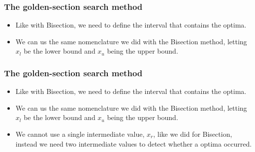 \documentclass{if-beamer}
\begin{document}
\begin{frame}[t]
	\frametitle{The golden-section search method}
	\begin{itemize}
		\item Like with Bisection, we need to define the interval that contains the optima.
		\item We can us the same nomenclature we did with the Bisection method, letting $x_l$ be the lower bound and $x_u$ being the upper bound.
	\end{itemize}
\end{frame}

\begin{frame}[t]
	\frametitle{The golden-section search method}
	\begin{itemize}
		\item Like with Bisection, we need to define the interval that contains the optima.
		\item We can us the same nomenclature we did with the Bisection method, letting $x_l$ be the lower bound and $x_u$ being the upper bound.
		\item We cannot use a single intermediate value, $x_r$, like we did for Bisection, instead we need two intermediate values to detect whether a optima occurred.  \\\vspace{3pt}
	\end{itemize}
\end{frame}
\end{document}
